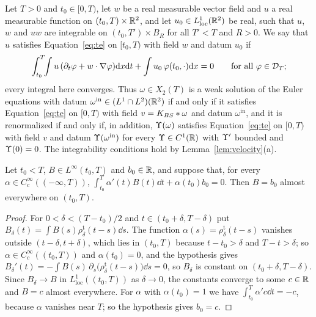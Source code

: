 Let $T>0$ and $t_0\in[0,T)$, let $w$ be a real measurable vector field and $u$ a
real measurable function on $(t_0,T)\times\mathbb{R}^2$, and let
$u_0\in L^1_{\mathrm{loc}}(\mathbb{R}^2)$ be real, such that $u$, $w$ and $uw$ are
integrable on $(t_0,T')\times B_R$ for all $T'<T$ and $R>0$. We say that $u$
satisfies Equation~\eqref{eq:te} on $[t_0,T)$ with field $w$ and datum $u_0$ if
\begin{equation}
\label{eq:te}
\int_{t_0}^T\!\!\int u\,(\partial_t\varphi+w\cdot\nabla\varphi)\dd x\dd t
+\int u_0\,\varphi(t_0,\cdot)\dd x=0
\qquad\text{for all }\varphi\in\mathcal{D}_T ;
\end{equation}
every integral here converges. Thus $\omega\in X_2(T)$ is a weak solution of the
Euler equations with datum
$\omega^{\mathrm{in}}\in (L^1\cap L^2)(\mathbb{R}^2)$ if and only if it satisfies
Equation~\eqref{eq:te} on $[0,T)$ with field $v=K_{BS}\ast\omega$ and datum
$\omega^{\mathrm{in}}$, and it is renormalized if and only if, in addition,
$\Upsilon(\omega)$ satisfies Equation~\eqref{eq:te} on $[0,T)$ with field $v$ and
datum $\Upsilon(\omega^{\mathrm{in}})$ for every $\Upsilon\in C^1(\mathbb{R})$ with $\Upsilon'$
bounded and $\Upsilon(0)=0$. The integrability conditions hold by
Lemma~\ref{lem:velocity}(a).

\begin{lemma}
\label{lem:dbr}
Let $t_0<T$, $B\in L^\infty(t_0,T)$ and $b_0\in\mathbb{R}$, and suppose that, for
every $\alpha\in C_c^\infty((-\infty,T))$,
$\int_{t_0}^T\alpha'(t)B(t)\dd t+\alpha(t_0)b_0=0$. Then $B=b_0$ almost
everywhere on $(t_0,T)$.
\end{lemma}

\begin{proof}
For $0<\delta<(T-t_0)/2$ and $t\in(t_0+\delta,T-\delta)$ put
$B_\delta(t)=\int B(s)\rho^{\mathrm t}_\delta(t-s)\dd s$. The function
$\alpha(s)=\rho^{\mathrm t}_\delta(t-s)$ vanishes outside $(t-\delta,t+\delta)$,
which lies in $(t_0,T)$ because $t-t_0>\delta$ and $T-t>\delta$; so
$\alpha\in C_c^\infty((t_0,T))$ and $\alpha(t_0)=0$, and the hypothesis gives
$B_\delta'(t)=-\int B(s)\,\partial_s\big(\rho^{\mathrm t}_\delta(t-s)\big)\dd s=0$,
so $B_\delta$ is constant on $(t_0+\delta,T-\delta)$. Since $B_\delta\to B$ in
$L^1_{\mathrm{loc}}((t_0,T))$ as $\delta\to0$, the constants converge to some
$c\in\mathbb{R}$ and $B=c$ almost everywhere. For $\alpha$ with $\alpha(t_0)=1$ we have
$\int_{t_0}^T\alpha'c\dd t=-c$, because $\alpha$ vanishes near $T$; so the
hypothesis gives $b_0=c$.
\end{proof}

